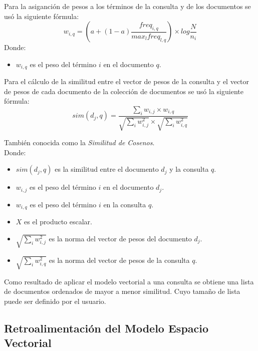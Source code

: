 \documentclass{llncs}
\begin{document}
	Para la asiganci\'on de pesos a los t\'erminos de la consulta y de los documentos se us\'o la siguiente f\'ormula:\\
	\begin{equation}
		w_{i,q} =(a + (1-a)\frac{freq_{i,q}}{max_{l}freq_{l,q}}) \times{log\frac{N}{n_i}}
	\end{equation}
	Donde: \\
	\begin{itemize}
		\item $w_{i,q}$ es el peso del t\'ermino $i$ en el documento $q$.
	\end{itemize}

	Para el c\'alculo de la similitud entre el vector de pesos de la consulta y el vector de pesos de cada documento de la colecci\'on 
	de documentos se us\'o la siguiente f\'ormula:\\
	\begin{equation}
		sim(d_{j}, q) = \frac{\sum_{i} w_{i,j} \times w_{i,q}}{\sqrt{\sum_{i} w_{i,j}^{2}} \times \sqrt{\sum_{i} w_{i,q}^{2}}}
	\end{equation}

	Tambi\'en conocida como la \textit{Similitud de Cosenos}.\\
	Donde: \\
	\begin{itemize}
		\item $sim(d_{j}, q)$ es la similitud entre el documento $d_{j}$ y la consulta $q$.
		\item $w_{i,j}$ es el peso del t\'ermino $i$ en el documento $d_{j}$.
		\item $w_{i,q}$ es el peso del t\'ermino $i$ en la consulta $q$.
		\item $X$ es el producto escalar.
		\item $\sqrt{\sum_{i} w_{i,j}^{2}}$ es la norma del vector de pesos del documento $d_{j}$.
		\item $\sqrt{\sum_{i} w_{i,q}^{2}}$ es la norma del vector de pesos de la consulta $q$.
	\end{itemize}

	Como resultado de aplicar el modelo vectorial a una consulta se obtiene una lista de documentos ordenados de mayor a menor similitud. 
	Cuyo tama\~no de lista puede ser definido por el usuario.\\

	\subsection{Retroalimentaci\'on del Modelo Espacio Vectorial}
	
\end{document}
